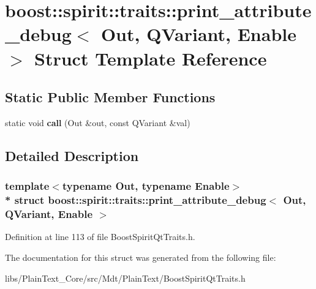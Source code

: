 \hypertarget{structboost_1_1spirit_1_1traits_1_1print__attribute__debug_3_01_out_00_01_q_variant_00_01_enable_01_4}{}\section{boost\+:\+:spirit\+:\+:traits\+:\+:print\+\_\+attribute\+\_\+debug$<$ Out, Q\+Variant, Enable $>$ Struct Template Reference}
\label{structboost_1_1spirit_1_1traits_1_1print__attribute__debug_3_01_out_00_01_q_variant_00_01_enable_01_4}
\subsection*{Static Public Member Functions}
\begin{DoxyCompactItemize}
\item 
static void {\bfseries call} (Out \&out, const Q\+Variant \&val)\hypertarget{structboost_1_1spirit_1_1traits_1_1print__attribute__debug_3_01_out_00_01_q_variant_00_01_enable_01_4_af472b8c19ad1fb40d423af723718c38e}{}\label{structboost_1_1spirit_1_1traits_1_1print__attribute__debug_3_01_out_00_01_q_variant_00_01_enable_01_4_af472b8c19ad1fb40d423af723718c38e}

\end{DoxyCompactItemize}


\subsection{Detailed Description}
\subsubsection*{template$<$typename Out, typename Enable$>$\\*
struct boost\+::spirit\+::traits\+::print\+\_\+attribute\+\_\+debug$<$ Out, Q\+Variant, Enable $>$}



Definition at line 113 of file Boost\+Spirit\+Qt\+Traits.\+h.



The documentation for this struct was generated from the following file\+:\begin{DoxyCompactItemize}
\item 
libs/\+Plain\+Text\+\_\+\+Core/src/\+Mdt/\+Plain\+Text/Boost\+Spirit\+Qt\+Traits.\+h\end{DoxyCompactItemize}
